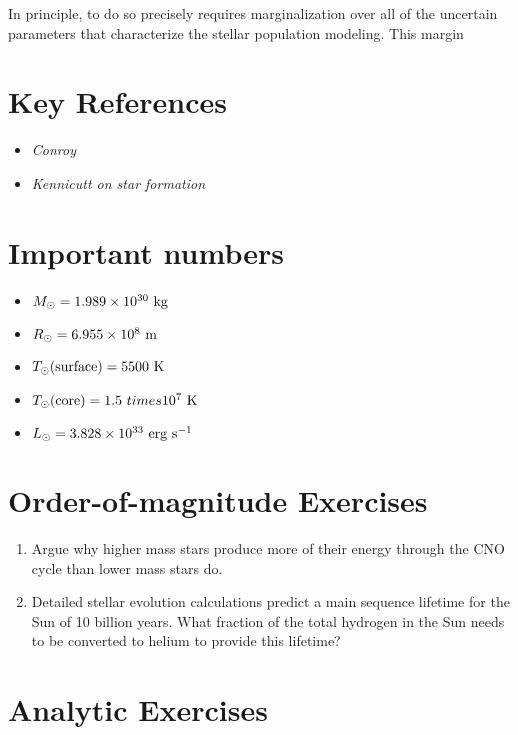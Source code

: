 In principle, to do so precisely requires marginalization over all of
the uncertain parameters that characterize the stellar population
modeling. This margin

\section{Key References}

\begin{itemize}
  \item
    {\it Conroy}
  \item
    {\it Kennicutt on star formation}
\end{itemize}

\citet{gunn06a}

\section{Important numbers}

\begin{itemize}
\item $M_{\odot} = 1.989 \times 10^{30} {\rm ~kg} $
\item $R_{\odot} = 6.955 \times 10^{8} {\rm ~m} $
\item $T_{\odot}{\rm (surface)} = 5500 {\rm ~K} $
\item $T_{\odot}{\rm (core)} = 1.5 \ times 10^7 {\rm ~K} $
\item $L_{\odot} = 3.828 \times 10^{33} {\rm ~erg} {\rm ~s}^{-1}$
\end{itemize}

\section{Order-of-magnitude Exercises}

\begin{enumerate} 
\item Argue why higher mass stars produce more of their energy through
    the CNO cycle than lower mass stars do.
\item Detailed stellar evolution calculations predict a main sequence
    lifetime for the Sun of 10 billion years. What fraction of the
    total hydrogen in the Sun needs to be converted to helium to
    provide this lifetime?
\end{enumerate} 

\section{Analytic Exercises}

